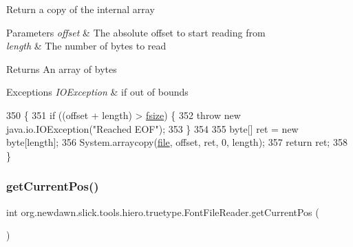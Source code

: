 Return a copy of the internal array


\begin{DoxyParams}{Parameters}
{\em offset} & The absolute offset to start reading from \\
\hline
{\em length} & The number of bytes to read \\
\hline
\end{DoxyParams}
\begin{DoxyReturn}{Returns}
An array of bytes 
\end{DoxyReturn}

\begin{DoxyExceptions}{Exceptions}
{\em I\+O\+Exception} & if out of bounds \\
\hline
\end{DoxyExceptions}

\begin{DoxyCode}
350                                                           \{
351         \textcolor{keywordflow}{if} ((offset + length) > \mbox{\hyperlink{classorg_1_1newdawn_1_1slick_1_1tools_1_1hiero_1_1truetype_1_1_font_file_reader_a247fb2663cf669a7842919c405f41bfe}{fsize}}) \{
352             \textcolor{keywordflow}{throw} \textcolor{keyword}{new} java.io.IOException(\textcolor{stringliteral}{"Reached EOF"});
353         \}
354 
355         byte[] ret = \textcolor{keyword}{new} byte[length];
356         System.arraycopy(\mbox{\hyperlink{classorg_1_1newdawn_1_1slick_1_1tools_1_1hiero_1_1truetype_1_1_font_file_reader_ab4c57b8a3e3eba60293c11bf50d7cc42}{file}}, offset, ret, 0, length);
357         \textcolor{keywordflow}{return} ret;
358     \}
\end{DoxyCode}
\mbox{\label{classorg_1_1newdawn_1_1slick_1_1tools_1_1hiero_1_1truetype_1_1_font_file_reader_a6eea216bcec24a77aa60baee42672ef9}} 
\subsubsection{\texorpdfstring{get\+Current\+Pos()}{getCurrentPos()}}
{\footnotesize\ttfamily int org.\+newdawn.\+slick.\+tools.\+hiero.\+truetype.\+Font\+File\+Reader.\+get\+Current\+Pos (\begin{DoxyParamCaption}{ }\end{DoxyParamCaption})\hspace{0.3cm}{\ttfamily [inline]}}


